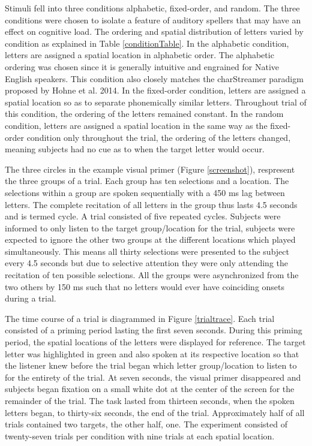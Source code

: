 \documentclass[12pt]{article}
\begin{document}
Stimuli fell into three conditions alphabetic, fixed-order, and
random.  The three conditions were chosen to isolate a feature of
auditory spellers that may have an effect on cognitive load.  The
ordering and spatial distribution of letters varied by condition as
explained in Table \ref{conditionTable}.  In the alphabetic
condition, letters are assigned a spatial location in alphabetic
order.  The alphabetic ordering was chosen since it is generally
intuitive and engrained for Native English speakers.  This condition
also closely matches the charStreamer paradigm proposed by Hohne et
al.  2014\cite{Hohne2014}.  In the fixed-order condition, letters
are assigned a spatial location so as to separate phonemically
similar letters.  Throughout trial of this condition, the ordering
of the letters remained constant.  In the random condition, letters
are assigned a spatial location in the same way as the fixed-order
condition only throughout the trial, the ordering of the letters
changed, meaning subjects had no cue as to when the target letter
would occur. 

The three circles in the example visual primer (Figure
\ref{screenshot}), respresent the three groups of a trial.  Each
group has ten selections and a location.  The selections within a
group are spoken sequentially with a 450 ms lag between letters.
The complete recitation of all letters in the group thus lasts 4.5
seconds and is termed cycle.  A trial consisted of five repeated
cycles. Subjects were informed to only listen to the target
group/location for the trial, subjects were expected to ignore the
other two groups at the different locations which played
simultaneously. This means all thirty selections were presented to
the subject every 4.5 seconds but due to selective attention they
were only attending the recitation of ten possible selections. All
the groups were asynchronized from the two others by 150 ms such
that no letters would ever have coinciding onsets during a trial.

The time course of a trial is diagrammed in Figure \ref{trialtrace}.
Each trial consisted of a priming period lasting the first seven
seconds.  During this priming period, the spatial locations of the
letters were displayed for reference.  The target letter was
highlighted in green and also spoken at its respective location so
that the listener knew before the trial began which letter
group/location to listen to for the entirety of the trial. At seven
seconds, the visual primer disappeared and subjects began fixation on
a small white dot at the center of the screen for the remainder of
the trial.  The task lasted from thirteen seconds, when the spoken
letters began, to thirty-six seconds, the end of the trial.
Approximately half of all trials contained
two targets, the other half, one. The experiment consisted of
twenty-seven trials per condition with nine trials at each
spatial location.  
\end{document}
